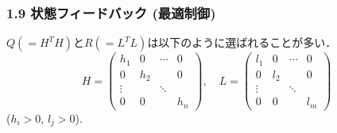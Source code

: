 \begin{frame}[t]
\frametitle{1.9 状態フィードバック (最適制御)}
$Q(=H^T H)$と$R(=L^T L)$は以下のように選ばれることが多い．
\begin{equation}
 H = \left(\begin{array}{cccc}
            h_1    & 0   & \cdots & 0 \\
      0      & h_2 &        & 0 \\
      \vdots &     & \ddots & \\
      0      & 0   &        & h_n
     \end{array}\right)
 , \quad
 L = \left(\begin{array} {cccc}
            l_1    & 0   & \cdots & 0 \\
      0      & l_2 &        & 0 \\
      \vdots &     & \ddots & \\
      0      & 0   &        & l_m
     \end{array}\right)
\end{equation}
($h_i>0$, $l_j>0$).
\end{frame}


